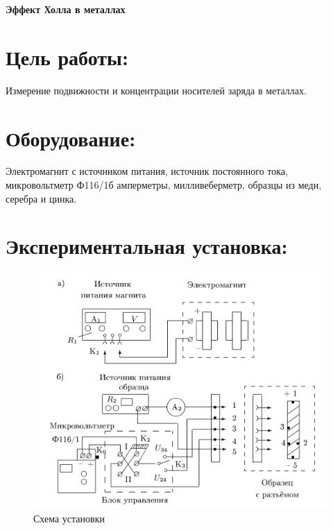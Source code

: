 \documentclass[a4paper, fontsize=14pt]{article}
\begin{document}
\parindent=1cm


\huge
\centering
\textbf{Эффект Холла в металлах}
\raggedright
\large
\section*{Цель работы:}
Измерение подвижности и концентрации носителей заряда в металлах.
\section*{Оборудование:}
Электромагнит с источником питания, источник постоянного тока, микровольтметр Ф116/1б амперметры, милливеберметр, образцы из меди, серебра и цинка.
\section*{Экспериментальная установка:}
\begin{figure}[H]
\center
\includegraphics[scale=0.3]{ust.png}
\caption{Схема установки}
\end{figure}
\end{document}
